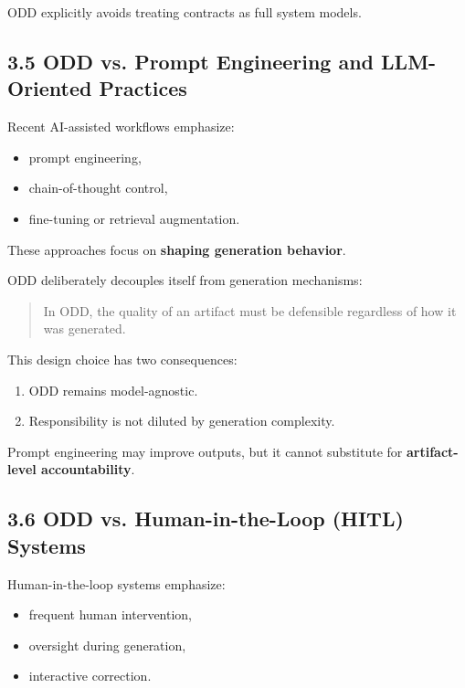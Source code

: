 \documentclass[
]{article}
\begin{document}
ODD explicitly avoids treating contracts as full system models.

\hypertarget{35-odd-vs-prompt-engineering-and-llm-oriented-practices}{%
\subsection{3.5 ODD vs. Prompt Engineering and LLM-Oriented
Practices}\label{35-odd-vs-prompt-engineering-and-llm-oriented-practices}}

Recent AI-assisted workflows emphasize:

\begin{itemize}
\item
  prompt engineering,
\item
  chain-of-thought control,
\item
  fine-tuning or retrieval augmentation.
\end{itemize}

These approaches focus on \textbf{shaping generation behavior}.

ODD deliberately decouples itself from generation mechanisms:

\begin{quote}
In ODD, the quality of an artifact must be defensible regardless of how
it was generated.
\end{quote}

This design choice has two consequences:

\begin{enumerate}
\def\labelenumi{\arabic{enumi}.}
\item
  ODD remains model-agnostic.
\item
  Responsibility is not diluted by generation complexity.
\end{enumerate}

Prompt engineering may improve outputs, but it cannot substitute for
\textbf{artifact-level accountability}.

\hypertarget{36-odd-vs-human-in-the-loop-hitl-systems}{%
\subsection{3.6 ODD vs. Human-in-the-Loop (HITL)
Systems}\label{36-odd-vs-human-in-the-loop-hitl-systems}}

Human-in-the-loop systems emphasize:

\begin{itemize}
\item
  frequent human intervention,
\item
  oversight during generation,
\item
  interactive correction.
\end{itemize}
\end{document}
